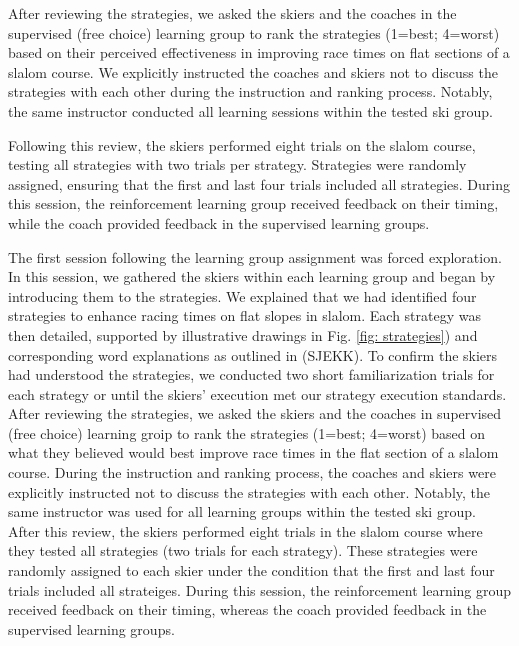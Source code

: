 After reviewing the strategies, we asked the skiers and the coaches in the supervised (free choice) learning group to rank the strategies (1=best; 4=worst) based on their perceived effectiveness in improving race times on flat sections of a slalom course. We explicitly instructed the coaches and skiers not to discuss the strategies with each other during the instruction and ranking process. Notably, the same instructor conducted all learning sessions within the tested ski group.

Following this review, the skiers performed eight trials on the slalom course, testing all strategies with two trials per strategy. Strategies were randomly assigned, ensuring that the first and last four trials included all strategies. During this session, the reinforcement learning group received feedback on their timing, while the coach provided feedback in the supervised learning groups.

 






















The first session following the learning group assignment was forced exploration. In this session, we gathered the skiers within each learning group and began by introducing them to the strategies. We explained that we had identified four strategies to enhance racing times on flat slopes in slalom. Each strategy was then detailed, supported by illustrative drawings in Fig. \ref{fig: strategies}) and corresponding word explanations as outlined in (SJEKK). To confirm the skiers had understood the strategies, we conducted two short familiarization trials for each strategy or until the skiers' execution met our strategy execution standards. After reviewing the strategies, we asked the skiers and the coaches in supervised (free choice) learning groip to rank the strategies (1=best; 4=worst) based on what they believed would best improve race times in the flat section of a slalom course. During the instruction and ranking process, the coaches and skiers were explicitly instructed not to discuss the strategies with each other. Notably, the same instructor was used for all learning groups within the tested ski group. After this review, the skiers performed eight trials in the slalom course where they tested all strategies (two trials for each strategy). These strategies were randomly assigned to each skier under the condition that the first and last four trials included all strateiges. During this session, the reinforcement learning group received feedback on their timing, whereas the coach provided feedback in the supervised learning groups.

